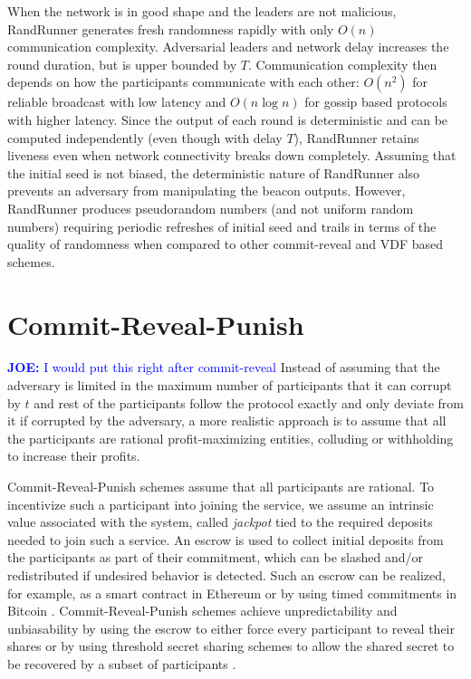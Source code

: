 \documentclass[letterpaper,twocolumn,10pt]{article}
\theoremstyle{definition}
\theoremstyle{remark}
\newcommand{\joenote}[1]{\textcolor{blue}{\textbf{JOE:} #1}}
\begin{document}
When the network is in good shape and the leaders are not malicious, RandRunner generates fresh randomness rapidly with only $O(n)$ communication complexity. Adversarial leaders and network delay increases the round duration, but is upper bounded by $T$. Communication complexity then depends on how the participants communicate with each other: $O(n^2)$ for reliable broadcast with low latency and $O(n \log n)$ for gossip based protocols with higher latency. Since the output of each round is deterministic and can be computed independently (even though with delay $T$), RandRunner retains liveness even when network connectivity breaks down completely. Assuming that the initial seed is not biased, the deterministic nature of RandRunner also prevents an adversary from manipulating the beacon outputs. However, RandRunner produces pseudorandom numbers (and not uniform random numbers) requiring periodic refreshes of initial seed and trails in terms of the quality of randomness when compared to other commit-reveal and VDF based schemes.

\section{Commit-Reveal-Punish}
\joenote{I would put this right after commit-reveal}
\label{section:commit-reveal-punish}
Instead of assuming that the adversary is limited in the maximum number of participants  that it can corrupt by $t$ and rest of the participants follow the protocol exactly and only deviate from it if corrupted by the adversary, a more realistic approach is to assume that all the participants are rational profit-maximizing entities, colluding or withholding to increase their profits. 

Commit-Reveal-Punish schemes assume that all participants are rational. To incentivize such a participant into joining the service, we assume an intrinsic value associated with the system, called \emph{jackpot} tied to the required deposits needed to join such a service. An escrow is used to collect initial deposits from the participants as part of their commitment, which can be slashed and/or redistributed if undesired behavior is detected. Such an escrow can be realized, for example, as a smart contract in Ethereum \cite{youcai2017randao, david2020economically} or by using timed commitments \cite{boneh2000timed} in Bitcoin \cite{andrychowicz2014secure}.  Commit-Reveal-Punish schemes achieve unpredictability and unbiasability by using the escrow to either force every participant to reveal their shares \cite{youcai2017randao, andrychowicz2014secure} or by using threshold secret sharing schemes to allow the shared secret to be recovered by a subset of participants \cite{david2020economically}. 
\end{document}
